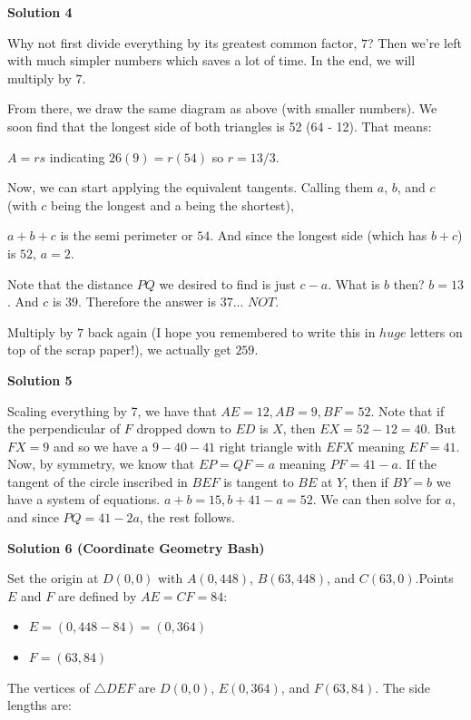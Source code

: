 \begin{enumerate}
\textbf{Solution 4}

Why not first divide everything by its greatest common factor, $7$? Then we're left with much simpler numbers which saves a lot of time. In the end, we will multiply by $7$.

 From there, we draw the same diagram as above (with smaller numbers). We soon find that the longest side of both triangles is 52 (64 - 12). That means:

 $A = rs$ indicating $26(9)=r(54)$ so $r = 13/3$.

 Now, we can start applying the equivalent tangents. Calling them $a$, $b$, and $c$ (with $c$ being the longest and a being the shortest),

 $a+b+c$ is the semi perimeter or $54$. And since the longest side (which has $b+c$) is $52$, $a=2$.

 Note that the distance $PQ$ we desired to find is just $c - a$. What is $b$ then? $b = 13$. And $c$ is $39$. Therefore the answer is $37$... $NOT.$

 Multiply by $7$ back again (I hope you remembered to write this in $huge$ letters on top of the scrap paper!), we actually get $\boxed{259}$.

 



\textbf{Solution 5}

Scaling everything by 7, we have that $AE = 12, AB = 9, BF = 52$. Note that  if the perpendicular of $F$ dropped down to $ED$ is $X$, then $EX  = 52-12 = 40$. But $FX = 9$ and so we have a $9-40-41$ right triangle with $EFX$ meaning $EF = 41$. Now, by symmetry, we know that $EP = QF = a$ meaning $PF = 41-a$. If the tangent of the circle inscribed in $BEF$ is tangent to $BE$ at $Y$, then if $BY = b$ we have a system of equations. $a+b = 15, b+41-a = 52$. We can then solve for $a$, and since $PQ = 41-2a$, the rest follows.

 



\textbf{Solution 6 (Coordinate Geometry Bash)}

Set the origin at $D(0,0)$ with $A(0, 448)$, $B(63, 448)$, and $C(63, 0)$.Points $E$ and $F$ are defined by $AE=CF=84$:

 
            \begin{itemize}
        \item $E = (0, 448 - 84) = (0, 364)$
        \item $F = (63, 84)$
            \end{itemize}
            The vertices of $\triangle DEF$ are $D(0,0)$, $E(0, 364)$, and $F(63, 84)$. The side lengths are:


\end{enumerate}
